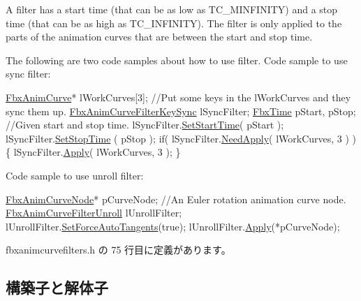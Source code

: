 A filter has a start time (that can be as low as T\+C\+\_\+\+M\+I\+N\+F\+I\+N\+I\+TY) and a stop time (that can be as high as T\+C\+\_\+\+I\+N\+F\+I\+N\+I\+TY). The filter is only applied to the parts of the animation curves that are between the start and stop time.

The following are two code samples about how to use filter. Code sample to use sync filter\+: 
\begin{DoxyCode}
\hyperlink{class_fbx_anim_curve}{FbxAnimCurve}* lWorkCurves[3]; \textcolor{comment}{//Put some keys in the lWorkCurves and they sync them up.}
\hyperlink{class_fbx_anim_curve_filter_key_sync}{FbxAnimCurveFilterKeySync} lSyncFilter;
\hyperlink{class_fbx_time}{FbxTime} pStart, pStop; \textcolor{comment}{//Given start and stop time.}
lSyncFilter.\hyperlink{class_fbx_anim_curve_filter_ad5833e1664b9621b4bafef76944ad383}{SetStartTime}( pStart );
lSyncFilter.\hyperlink{class_fbx_anim_curve_filter_a75fd5bf41a315dd12d8efb3184a17fc8}{SetStopTime} ( pStop  );
\textcolor{keywordflow}{if}( lSyncFilter.\hyperlink{class_fbx_anim_curve_filter_key_sync_a987ccf74bf3bdf7828812067d895950c}{NeedApply}( lWorkCurves, 3 ) )
\{
    lSyncFilter.\hyperlink{class_fbx_anim_curve_filter_key_sync_a4eb3dd7372f7747bcae1be8722db75e0}{Apply}( lWorkCurves, 3 );
\}
\end{DoxyCode}


Code sample to use unroll filter\+: 
\begin{DoxyCode}
\hyperlink{class_fbx_anim_curve_node}{FbxAnimCurveNode}* pCurveNode; \textcolor{comment}{//An Euler rotation animation curve node.}
\hyperlink{class_fbx_anim_curve_filter_unroll}{FbxAnimCurveFilterUnroll} lUnrollFilter;
lUnrollFilter.\hyperlink{class_fbx_anim_curve_filter_unroll_ae4d857f9f855136c18103315e473bbc3}{SetForceAutoTangents}(\textcolor{keyword}{true});
lUnrollFilter.\hyperlink{class_fbx_anim_curve_filter_unroll_ae9b4807d576e93ae4800c1764f2aabda}{Apply}(*pCurveNode);
\end{DoxyCode}
 

 fbxanimcurvefilters.\+h の 75 行目に定義があります。



\subsection{構築子と解体子}
\mbox{\label{class_fbx_anim_curve_filter_ac908ea01d9d49a263be450e760dabcce}} 
